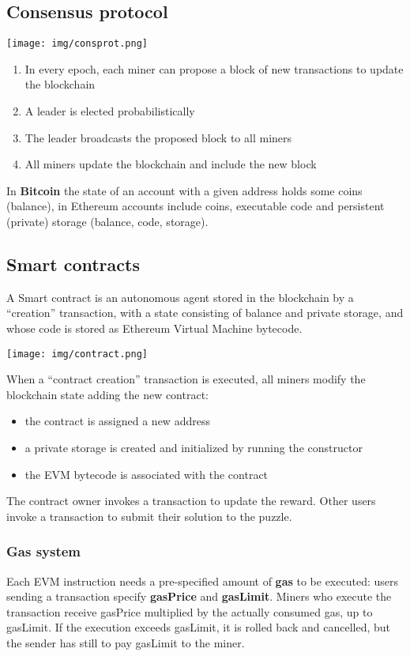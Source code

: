 \documentclass[a4paper, 10pt, titlepage]{article}
\begin{document}
\subsection{Consensus protocol}
\begin{center}
\texttt{[image: img/consprot.png]}
\end{center}
\begin{enumerate}
\item In every epoch, each miner can propose a block of new transactions to update the blockchain
\item A leader is elected probabilistically
\item The leader broadcasts the proposed block to all miners
\item All miners update the blockchain and include the new block
\end{enumerate}
In \textbf{Bitcoin} the state of an account with a given address holds some coins (balance), in Ethereum accounts include coins, executable code and persistent (private) storage (balance, code, storage).

\subsection{Smart contracts}
A Smart contract is an autonomous agent stored in the blockchain by a “creation” transaction, with a state consisting of balance and private storage, and whose code is stored as Ethereum Virtual Machine bytecode. 
\begin{center}
\texttt{[image: img/contract.png]}
\end{center}
When a “contract creation” transaction is executed, all miners modify the blockchain state adding the new contract: 
\begin{itemize}
\item the contract is assigned a new address
\item a private storage is created and initialized by running the constructor
\item the EVM bytecode is associated with the contract
\end{itemize} 
The contract owner invokes a transaction to update the reward. Other users invoke a transaction to submit their solution to the puzzle.

\subsubsection{Gas system}
Each EVM instruction needs a pre-specified amount of \textbf{gas} to be executed: users sending a transaction specify \textbf{gasPrice} and \textbf{gasLimit}.
Miners who execute the transaction receive gasPrice multiplied by the actually consumed gas, up to gasLimit. If the execution exceeds gasLimit, it is rolled back and cancelled, but the sender has still to pay gasLimit to the miner.
\end{document}
